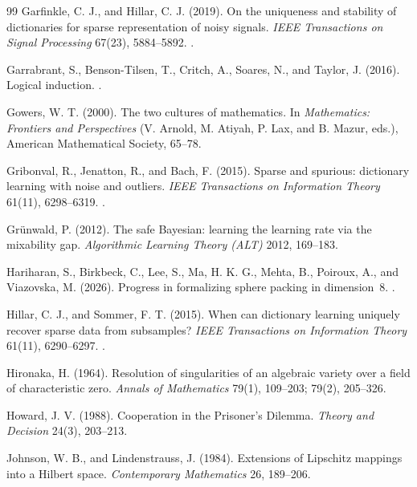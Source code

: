 \begin{thebibliography}{99}
 Garfinkle, C. J., and Hillar, C. J. (2019). On the uniqueness and stability of dictionaries for sparse representation of noisy signals. \emph{IEEE Transactions on Signal Processing} 67(23), 5884--5892. .

 Garrabrant, S., Benson-Tilsen, T., Critch, A., Soares, N., and Taylor, J. (2016). Logical induction. .

 Gowers, W. T. (2000). The two cultures of mathematics. In \emph{Mathematics: Frontiers and Perspectives} (V. Arnold, M. Atiyah, P. Lax, and B. Mazur, eds.), American Mathematical Society, 65--78.

 Gribonval, R., Jenatton, R., and Bach, F. (2015). Sparse and spurious: dictionary learning with noise and outliers. \emph{IEEE Transactions on Information Theory} 61(11), 6298--6319. .

 Gr\"unwald, P. (2012). The safe Bayesian: learning the learning rate via the mixability gap. \emph{Algorithmic Learning Theory (ALT)} 2012, 169--183.





 Hariharan, S., Birkbeck, C., Lee, S., Ma, H. K. G., Mehta, B., Poiroux, A., and Viazovska, M. (2026). Progress in formalizing sphere packing in dimension~8. .

 Hillar, C. J., and Sommer, F. T. (2015). When can dictionary learning uniquely recover sparse data from subsamples? \emph{IEEE Transactions on Information Theory} 61(11), 6290--6297. .

 Hironaka, H. (1964). Resolution of singularities of an algebraic variety over a field of characteristic zero. \emph{Annals of Mathematics} 79(1), 109--203; 79(2), 205--326.

 Howard, J. V. (1988). Cooperation in the Prisoner's Dilemma. \emph{Theory and Decision} 24(3), 203--213.



 Johnson, W. B., and Lindenstrauss, J. (1984). Extensions of Lipschitz mappings into a Hilbert space. \emph{Contemporary Mathematics} 26, 189--206.


\end{thebibliography}
